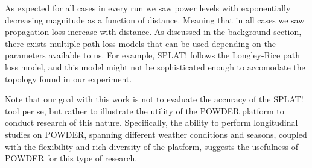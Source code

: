 As expected for all cases in every run we saw power levels with exponentially decreasing magnitude as a function of 
distance. Meaning that in all cases we saw propagation loss increase with distance. As discussed in the background section, 
there exists multiple path loss models that can be used depending on the parameters available to us. For example, SPLAT! 
follows the Longley-Rice path loss model, and this model might not be sophisticated
enough to accomodate the topology found in our experiment.

Note that our goal with this work is not to evaluate the accuracy of the SPLAT! tool
per se, but rather to illustrate the utility of the POWDER platform to conduct research 
of this nature. Specifically, the ability to perform longitudinal studies on POWDER, spanning different weather conditions and seasons, coupled with the flexibility
and rich diversity of the platform, suggests the usefulness of POWDER for this type of
research.   
